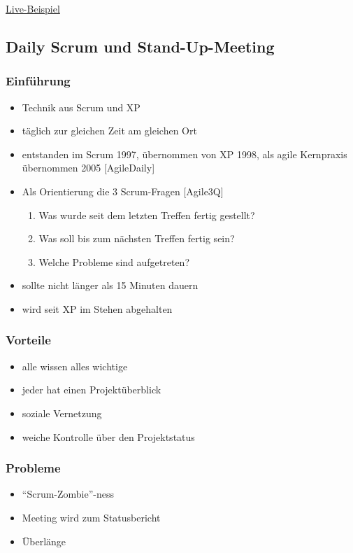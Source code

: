 \documentclass[%
	handout
]{beamer}
\newcommand{\daily}{[AgileDaily]}
\newcommand{\tq}{[Agile3Q]}
\begin{document}
		\begin{frame}
			\href{http://www.kanbansim.org/boards/3a5a5acdb1c24535e9962dd20fe434b3}{Live-Beispiel}
		\end{frame}
		
	\subsection{Daily Scrum und Stand-Up-Meeting}
		\begin{frame}
			\frametitle{Einführung}
			\begin{itemize}
				\item Technik aus Scrum und XP\pause
				\item täglich zur gleichen Zeit am gleichen Ort\pause
				\item entstanden im Scrum 1997, übernommen von XP 1998, als agile Kernpraxis übernommen 2005 \daily\pause
				\item Als Orientierung die 3 Scrum-Fragen \tq
				\begin{enumerate}
					\item Was wurde seit dem letzten Treffen fertig gestellt?
					\item Was soll bis zum nächsten Treffen fertig sein?
					\item Welche Probleme sind aufgetreten?
				\end{enumerate}\pause
				\item sollte nicht länger als 15 Minuten dauern\pause
				\item wird seit XP im Stehen abgehalten
			\end{itemize}
		\end{frame}
		
		\begin{frame}
			\frametitle{Vorteile}
			\begin{itemize}
				\item alle wissen alles wichtige
				\item jeder hat einen Projektüberblick
				\item soziale Vernetzung
				\item weiche Kontrolle über den Projektstatus
			\end{itemize}
		\end{frame}
		
		\begin{frame}
			\frametitle{Probleme}
			\begin{itemize}
				\item ``Scrum-Zombie''-ness
				\item Meeting wird zum Statusbericht
				\item Überlänge
			\end{itemize}
		\end{frame}
		
\end{document}

